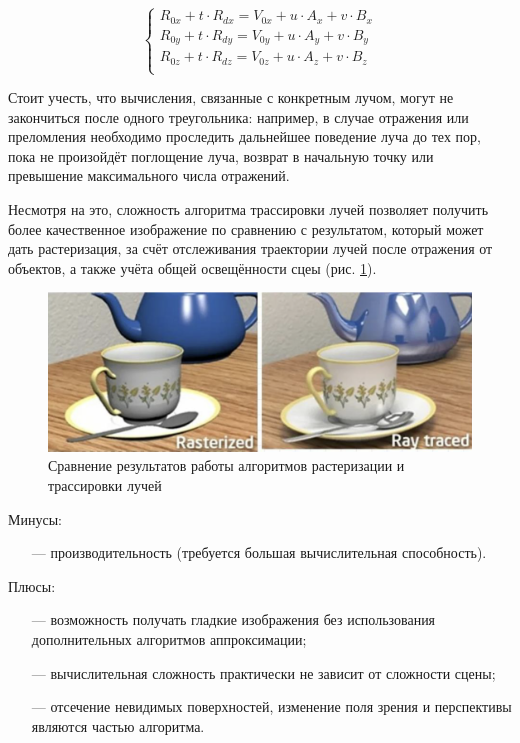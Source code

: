 \begin{equation}
	\begin{cases}
		R_{0x} + t \cdot R_{dx} = V_{0x} + u \cdot A_x + v \cdot B_x \\
		R_{0y} + t \cdot R_{dy} = V_{0y} + u \cdot A_y + v \cdot B_y \\
		R_{0z} + t \cdot R_{dz} = V_{0z} + u \cdot A_z + v \cdot B_z \\
	\end{cases}
	\label{eq:rsys}
\end{equation}

Стоит учесть, что вычисления, связанные с конкретным лучом, могут не 
закончиться после одного треугольника: например, в случае отражения или 
преломления необходимо проследить дальнейшее поведение луча до тех пор, 
пока не произойдёт поглощение луча, возврат в начальную точку или превышение максимального числа отражений.

Несмотря на это, сложность алгоритма трассировки лучей позволяет получить более качественное изображение по сравнению с результатом, который может дать растеризация, за счёт отслеживания траектории лучей после отражения от объектов, а также учёта общей освещённости сцеы (рис. \ref{fig:rasterisationVsRayTracing}). \clearpage

\begin{figure}[h]
	\centering
	\captionsetup{justification=centering}
	\includegraphics[width=120mm]{img/rasterisationVsRayTracing.png}
	\caption{Сравнение результатов работы алгоритмов растеризации и 
		трассировки лучей}
	\label{fig:rasterisationVsRayTracing}
\end{figure}

Минусы:
\begin{itemize}[leftmargin=1.6\parindent]
	\item[---] производительность (требуется большая вычислительная способность).
\end{itemize}

Плюсы:
\begin{itemize}[leftmargin=1.6\parindent]
	\item[---] возможность получать гладкие изображения без использования 
	дополнительных алгоритмов аппроксимации;
	\item[---] вычислительная сложность практически не зависит от сложности сцены;
	\item[---] отсечение невидимых поверхностей, изменение поля зрения и 
	перспективы являются частью алгоритма.
\end{itemize}

